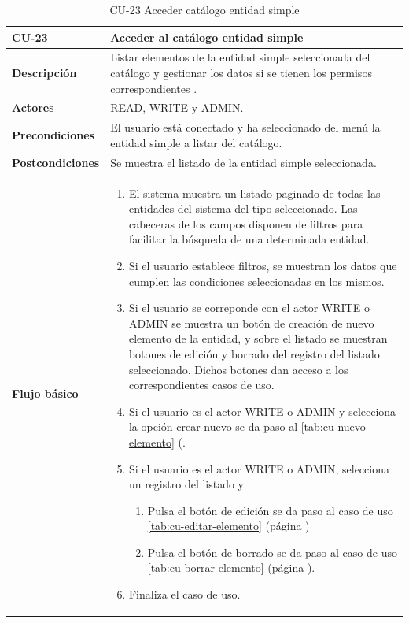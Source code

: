 \begin{table} [H]
    \centering
    \setlength{\leftmargini}{0.4cm}
	\resizebox{14cm}{!} { %
    \begin{tabular}{| m{3cm} | m{11cm} |}   
    \hline
	  \textbf{CU-23} & \textbf{Acceder al catálogo entidad simple} \\\hline
	  \textbf{Descripción} & Listar elementos de la entidad simple seleccionada del catálogo y gestionar los datos si se tienen los permisos correspondientes . \\\hline
	  \textbf{Actores} & READ, WRITE y ADMIN. \\\hline
	  \textbf{Precondiciones} & El usuario está conectado y ha seleccionado del menú la entidad simple a listar del catálogo. \\\hline
	  \textbf{Postcondiciones} & Se muestra el listado de la entidad simple seleccionada. \\\hline
	  \textbf{Flujo básico} & 
		\begin{enumerate}
	  	\item El sistema muestra un listado paginado de todas las entidades del sistema del tipo seleccionado. Las
cabeceras de los campos disponen de filtros para facilitar la búsqueda de una determinada entidad.
		\item Si el usuario establece filtros, se muestran los datos que cumplen las condiciones seleccionadas en los mismos.
		\item Si el usuario se correponde con el actor WRITE o ADMIN se muestra un botón de creación de nuevo elemento de la entidad, y sobre el listado se muestran botones de edición y borrado del registro del listado seleccionado. Dichos botones dan acceso a los correspondientes casos de uso.
		\item Si el usuario es el actor WRITE o ADMIN y selecciona la opción crear nuevo se da paso al \ref{tab:cu-nuevo-elemento} (\pageref{tab:cu-nuevo-elemento}.
		\item Si el usuario es el actor WRITE o ADMIN, selecciona un registro del listado y
		    \begin{enumerate}
		        \item Pulsa el botón de edición se da paso al caso de uso \ref{tab:cu-editar-elemento} (página \pageref{tab:cu-editar-elemento})
		        \item Pulsa el botón de borrado se da paso al caso de uso \ref{tab:cu-borrar-elemento} (página \pageref{tab:cu-borrar-elemento}).
		    \end{enumerate} 
		\item Finaliza el caso de uso.		
	  \end{enumerate} 	  	  
	  \\\hline
    \end{tabular}
    } %
    \caption{CU-23 Acceder catálogo entidad simple}
    \label{tab:cu-listar-catalogo-simple}
\end{table}


